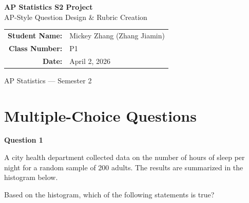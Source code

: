 \documentclass[12pt]{article}
\begin{document}
\begin{titlepage}
\centering
\vspace*{3cm}

{\Huge\bfseries AP Statistics S2 Project}\\[0.8cm]
{\LARGE AP-Style Question Design \& Rubric Creation}\\[2.5cm]

{\Large
\begin{tabular}{rl}
\textbf{Student Name:} & Mickey Zhang (Zhang Jiamin) \\[0.5cm]
\textbf{Class Number:} & P1 \\[0.5cm]
\textbf{Date:} & April 2, 2026 \\
\end{tabular}
}

\vfill
{\large AP Statistics --- Semester 2}
\end{titlepage}

\section*{Multiple-Choice Questions}

\noindent\textbf{Question 1}

A city health department collected data on the number of hours of sleep per night for a random sample of 200 adults. The results are summarized in the histogram below.

\begin{center}
\end{center}

Based on the histogram, which of the following statements is true?
\end{document}
